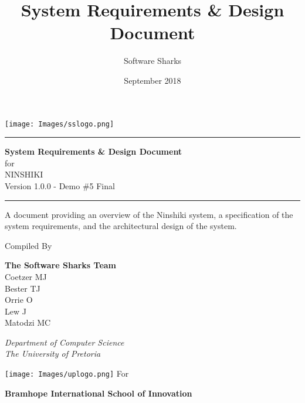 \documentclass[a4paper, 11pt]{article}
\title{System Requirements & Design Document}
\author{Software Sharks}
\date{September 2018}
\newcommand{\systemTitle}{NINSHIKI}
\begin{document}
\begin{titlepage}
\texttt{[image: Images/sslogo.png]}
	\centering
	
    \scshape
    \sffamily
	
	\vspace*{\baselineskip}
	
	\rule{\textwidth}{3pt}
	
	\vspace{0.75\baselineskip}
	
	\textrm{\LARGE \textbf{System Requirements \& Design Document} \\ for\\ \systemTitle{}\\ \small Version 1.0.0 - Demo \#5 Final\\}
	
	\vspace{0.75\baselineskip}
	
	\rule{\textwidth}{3pt} 
	
	\vspace{2\baselineskip}
	A document providing an overview of the Ninshiki system, a specification of the system requirements, and the architectural design of the system.\\
	
	\vspace*{3\baselineskip}
	
	Compiled By
	
	\vspace{0.5\baselineskip}
	
    \textsf{\large
    \textrm{\textbf{The Software Sharks Team}} \\
    \small 
    Coetzer MJ \\
    Bester TJ \\
    Orrie O \\
    Lew J \\
    Matodzi MC \\
    } 
	
	\vspace{0.5\baselineskip}
	
	\textit{ Department of Computer Science \\ The University of Pretoria}
	
    \vfill
    
    \texttt{[image: Images/uplogo.png]}
    \vfill
    For
	
	\vspace{0.5\baselineskip}
	
    \textsf{\large
    \textrm{\textbf{Bramhope International School of Innovation}} \\
    } 

\end{titlepage}
\end{document}
